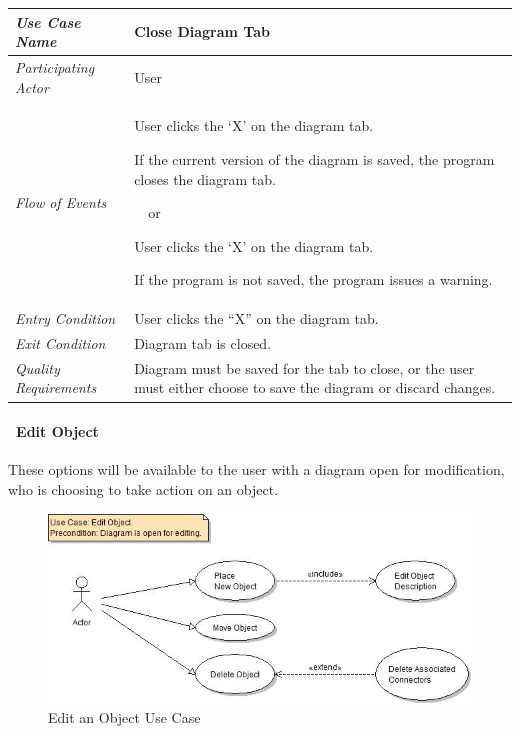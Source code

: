\documentclass[twoside,letterpaper]{article}
\newenvironment{my_enumerate}{
\begin{enumerate}
  \setlength{\itemsep}{1pt}
  \setlength{\parskip}{0pt}
  \setlength{\parsep}{0pt}}{\end{enumerate}
}
\begin{document}
\begin{flushleft}
\tablehead{}
\begin{tabular}{|m{2.0in} m{5.0in}|}
\hline
{\bfseries\emph{Use Case Name}}
& {\bfseries Close Diagram Tab}
\\\hline
\emph{Participating Actor}
& User
\\\hline
\emph{Flow of Events}
& \begin{my_enumerate}
\item User clicks the `X' on the diagram tab.
\item If the current version of the diagram is saved, the program closes the diagram tab.
\end{my_enumerate}
\ ~or
\begin{my_enumerate}
\item User clicks the `X' on the diagram tab.
\item If the program is not saved, the program issues a warning.
\end{my_enumerate}
\\\hline
\emph{Entry Condition}
& User clicks the ``X'' on the diagram tab.
\\\hline
\emph{Exit Condition}
& Diagram tab is closed.
\\\hline
\emph{Quality Requirements}
& Diagram must be saved for the tab to close, or the user must either choose to save the diagram or discard changes.
\\\hline
\end{tabular}
\end{flushleft}
\bigskip

\clearpage

\paragraph[\ Edit Object]
{\ Edit Object} {These options will be available to the user with a diagram open for modification, who is choosing to take action on an object.}

\begin{figure}[h]
\centering
\includegraphics[width=6.0in]{ucaseEditObj.jpg}
\caption{Edit an Object Use Case}
\end{figure}
\end{document}
